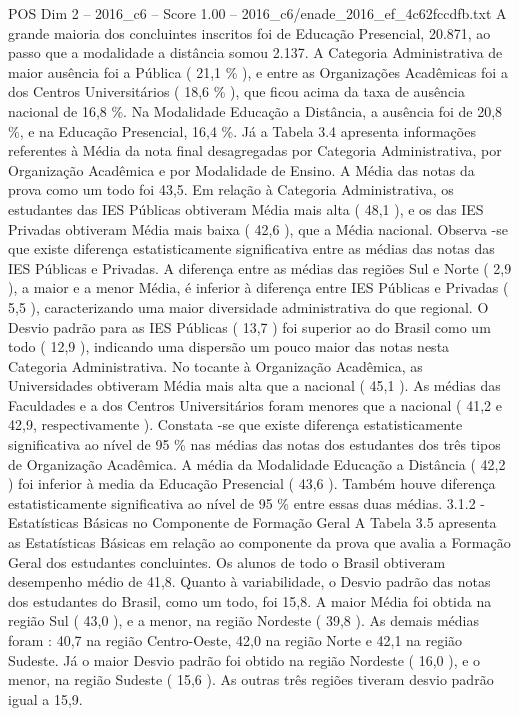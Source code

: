 \begin{textsample}{POS Dim 2 – 2016\_c6 – Score 1.00 – 2016\_c6/enade\_2016\_ef\_4c62fccdfb.txt}
A grande maioria dos concluintes inscritos foi de Educação Presencial, 20.871, ao passo que a modalidade a distância somou 2.137.
A Categoria Administrativa de maior ausência foi a Pública ( 21,1 \% ), e entre as Organizações Acadêmicas foi a dos Centros Universitários ( 18,6 \% ), que ficou acima da taxa de ausência nacional de 16,8 \%.
Na Modalidade Educação a Distância, a ausência foi de 20,8 \%, e na Educação Presencial, 16,4 \%.
Já a Tabela 3.4 apresenta informações referentes à Média da nota final desagregadas por Categoria Administrativa, por Organização Acadêmica e por Modalidade de Ensino.
A Média das notas da prova como um todo foi 43,5.
Em relação à Categoria Administrativa, os estudantes das IES Públicas obtiveram Média mais alta ( 48,1 ), e os das IES Privadas obtiveram Média mais baixa ( 42,6 ), que a Média nacional.
Observa -se que existe diferença estatisticamente significativa entre as médias das notas das IES Públicas e Privadas.
A diferença entre as médias das regiões Sul e Norte ( 2,9 ), a maior e a menor Média, é inferior à diferença entre IES Públicas e Privadas ( 5,5 ), caracterizando uma maior diversidade administrativa do que regional.
O Desvio padrão para as IES Públicas ( 13,7 ) foi superior ao do Brasil como um todo ( 12,9 ), indicando uma dispersão um pouco maior das notas nesta Categoria Administrativa.
No tocante à Organização Acadêmica, as Universidades obtiveram Média mais alta que a nacional ( 45,1 ).
As médias das Faculdades e a dos Centros Universitários foram menores que a nacional ( 41,2 e 42,9, respectivamente ).
Constata -se que existe diferença estatisticamente significativa ao nível de 95 \% nas médias das notas dos estudantes dos três tipos de Organização Acadêmica.
A média da Modalidade Educação a Distância ( 42,2 ) foi inferior à media da Educação Presencial ( 43,6 ).
Também houve diferença estatisticamente significativa ao nível de 95 \% entre essas duas médias. 3.1.2 - Estatísticas Básicas no Componente de Formação Geral A Tabela 3.5 apresenta as Estatísticas Básicas em relação ao componente da prova que avalia a Formação Geral dos estudantes concluintes.
Os alunos de todo o Brasil obtiveram desempenho médio de 41,8.
Quanto à variabilidade, o Desvio padrão das notas dos estudantes do Brasil, como um todo, foi 15,8.
A maior Média foi obtida na região Sul ( 43,0 ), e a menor, na região Nordeste ( 39,8 ).
As demais médias foram : 40,7 na região Centro-Oeste, 42,0 na região Norte e 42,1 na região Sudeste.
Já o maior Desvio padrão foi obtido na região Nordeste ( 16,0 ), e o menor, na região Sudeste ( 15,6 ).
As outras três regiões tiveram desvio padrão igual a 15,9.

\end{textsample}
